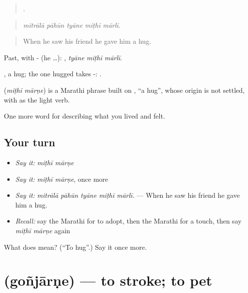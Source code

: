 \begin{quote}
    .
\end{quote}

\begin{quote}
\emph{mitrālā pāhūn tyāne miṭhī mārlī.}
\end{quote}

\begin{quote}
When he saw his friend he gave him a hug.
\end{quote}

Past, with - (he …):   , \emph{tyāne miṭhī mārlī}.

, a hug; the one hugged takes -:   .

\begin{cousinweb}
\textbf{ } (\emph{miṭhī mārṇe}) is a Marathi phrase built on , \textquotedblleft{}a hug\textquotedblright{}, whose origin is not settled, with  as the light verb.
\end{cousinweb}

\begin{grammarlens}[title={What you've built}]
One more word for describing what you lived and felt.
\end{grammarlens}

\subsection*{Your turn}
\begin{itemize}
\raggedright
  \item \emph{Say it:} \emph{miṭhī mārṇe}
  \item \emph{Say it:} \emph{miṭhī mārṇe}, once more
  \item \emph{Say it:} \emph{mitrālā pāhūn tyāne miṭhī mārlī.} — When he saw his friend he gave him a hug.
  \item \emph{Recall:} say the Marathi for to adopt, then the Marathi for a touch, then say \emph{miṭhī mārṇe} again
\end{itemize}

\begin{tcolorbox}[breakable,colback=teal!4,colframe=teal!35!black,title={Before you move on}]
What does   mean? (\textquotedblleft{}To hug\textquotedblright{}.) Say it once more.
\end{tcolorbox}
\section[\texorpdfstring{\mr{गोंजारणे} (goñjārṇe)}{गोंजारणे (goñjārṇe)}]{ (goñjārṇe) — to stroke; to pet}

